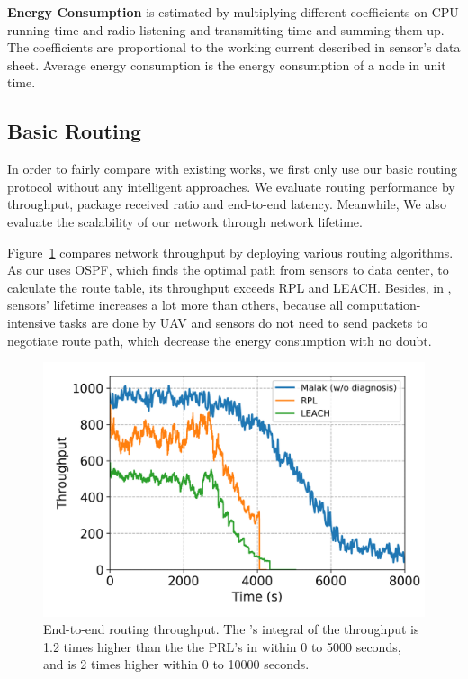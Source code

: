 \textbf{Energy Consumption} is estimated by multiplying different coefficients on
CPU running time and radio listening and transmitting time and summing them up.
The coefficients are proportional to the working current described in sensor's
data sheet. Average energy consumption is the energy consumption of a node in
unit time.

\subsection{Basic Routing}

In order to fairly compare with existing works, we first only use our basic
{\sdn} routing protocol without any intelligent approaches. We evaluate routing
performance by throughput, package received ratio and end-to-end latency.
Meanwhile, We also evaluate the scalability of our network through network
lifetime.

Figure~\ref{fig:throughput} compares network throughput by deploying various
routing algorithms. As our {\sdn} uses OSPF, which finds the optimal path from
sensors to data center, to calculate the route table, its throughput exceeds RPL
and LEACH. Besides, in {\sdn}, sensors' lifetime increases a lot more than
others, because all computation-intensive tasks are done by UAV and sensors do
not need to send packets to negotiate route path, which decrease the energy
consumption with no doubt.

\begin{figure}[htbp]
	\centering
	\includegraphics[width=.95\columnwidth]{Figure/throughput}
	\vspace{-0.1in}
	\caption{End-to-end routing throughput.
		\textnormal{
			The {\sdn}'s integral of the throughput is 1.2 times higher than the
			the PRL's in within 0 to 5000 seconds, and is 2 times higher within 0
			to 10000 seconds.
		}}
	\label{fig:throughput}
\end{figure}

